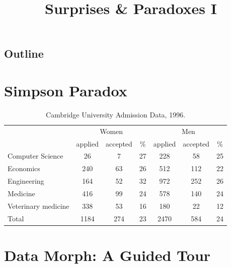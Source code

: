 \documentclass[10pt]{beamer}
\title{Surprises \& Paradoxes I}
\author{}
\date{}
\begin{document}
\begin{frame}
\titlepage
\end{frame}

\subsection*{Outline}
\begin{frame}
  \tableofcontents
\end{frame}

\section{Simpson Paradox}

\begin{frame}
\begin{table}[!htbp]
  \centering
  \begin{tabular}{lcccccc}
    \toprule
    & \multicolumn{3}{c}{Women} & \multicolumn{3}{c}{Men} \\
    & applied & accepted & \% & applied & accepted & \% \\
    \midrule
    Computer Science & 26 & 7 & 27 & 228 & 58 & 25 \\
    Economics & 240 & 63 & 26 & 512 & 112 & 22 \\
    Engineering & 164 & 52 & 32 & 972 & 252 & 26 \\
    Medicine & 416 & 99 & 24 & 578 & 140 & 24 \\
    Veterinary medicine & 338 & 53 & 16 & 180 & 22 & 12 \\
    \midrule
    Total & 1184 & 274 & 23 & 2470 & 584 & 24 \\
    \bottomrule
  \end{tabular}
  \caption{Cambridge University Admission Data, 1996.}
  \label{fig:simpson}
\end{table}
\end{frame}

\section{Data Morph: A Guided Tour}
\end{document}
